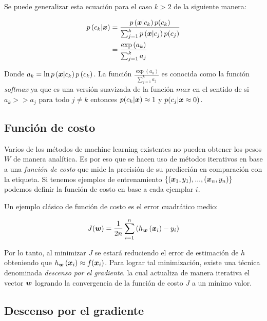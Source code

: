 Se puede generalizar esta ecuación para el caso $k > 2$ de la siguiente manera:

\begin{align}
    p\left( c_k | \boldsymbol{x} \right) &= \frac{p\left( \boldsymbol{x} | c_k \right)p(c_k)}{
                                                \sum_{j=1}^{k} p\left( \boldsymbol{x} |
                                                c_j \right) p(c_j) } \\
                                       &= \frac{\exp\left( a_k \right)}{\sum_{j=1}^{k} a_j} \\
\end{align}

Donde $a_k = \ln p\left( \boldsymbol{x} | c_k \right) p\left( c_k \right)$. La función
$\frac{\exp\left( a_k \right)}{\sum_{j=1}^{k} a_j}$ es conocida como la función
\emph{softmax} ya que es una versión suavizada de la función $max$ en el sentido de
si $a_k >> a_j$ para todo $j \neq k$ entonces $p(c_k | \boldsymbol{x}) \approx 1$ y
$p(c_j | \boldsymbol{x} \approx 0)$.

\subsection{Función de costo}

Varios de los métodos de machine learning existentes no pueden obtener los pesos
$W$ de manera analítica. Es por eso que se hacen uso de métodos iterativos en
base a una \emph{función de costo} que mide la precisión de su predicción en
comparación con la etiqueta. Si tenemos ejemplos de entrenamiento
$\{(\boldsymbol{x}_{1}, y_{1}), ..., (\boldsymbol{x}_{n}, y_{n})\}$ podemos definir la
función de costo en base a cada ejemplar $i$.

Un ejemplo clásico de función de costo es el error cuadrático medio:

\begin{align}
    J(\boldsymbol{w}) = \frac{1}{2n} \sum_{i=1}^{n}\left( h_{\boldsymbol{w}}\left( \boldsymbol{x}_{i}\right) - y_i \right)
\end{align}

Por lo tanto, al minimizar $J$ se estará reduciendo el error de estimación de $h$
obteniendo que $h_{\boldsymbol{w}}\left( \boldsymbol{x}_{i} \right) \approx f(\boldsymbol{x}_{i})$. Para
lograr tal minimización, existe una técnica denominada \emph{descenso por el
gradiente}. la cual actualiza de manera iterativa el vector $\boldsymbol{w}$ logrando
la convergencia de la función de costo $J$ a un mínimo valor.

\subsection{Descenso por el gradiente}

